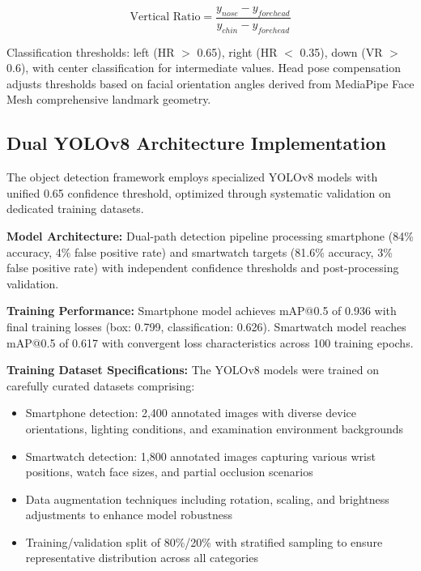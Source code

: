 \documentclass[conference]{IEEEtran}
\begin{document}
\begin{equation}
\text{Vertical Ratio} = \frac{y_{nose} - y_{forehead}}{y_{chin} - y_{forehead}}
\end{equation}

Classification thresholds: left (HR $>$ 0.65), right (HR $<$ 0.35), down (VR $>$ 0.6), 
with center classification for intermediate values. Head pose compensation adjusts 
thresholds based on facial orientation angles derived from MediaPipe Face Mesh 
comprehensive landmark geometry.

\subsection{Dual YOLOv8 Architecture Implementation}

The object detection framework employs specialized YOLOv8 models with unified 0.65 
confidence threshold, optimized through systematic validation on dedicated training 
datasets.

\textbf{Model Architecture:} Dual-path detection pipeline processing smartphone (84\% 
accuracy, 4\% false positive rate) and smartwatch targets (81.6\% accuracy, 3\% false 
positive rate) with independent confidence thresholds and post-processing validation.

\textbf{Training Performance:} Smartphone model achieves mAP@0.5 of 0.936 with final 
training losses (box: 0.799, classification: 0.626). Smartwatch model reaches mAP@0.5 
of 0.617 with convergent loss characteristics across 100 training epochs.

\textbf{Training Dataset Specifications:} The YOLOv8 models were trained on carefully 
curated datasets comprising:
\begin{itemize}
    \item Smartphone detection: 2,400 annotated images with diverse device orientations, 
    lighting conditions, and examination environment backgrounds
    \item Smartwatch detection: 1,800 annotated images capturing various wrist positions, 
    watch face sizes, and partial occlusion scenarios
    \item Data augmentation techniques including rotation, scaling, and brightness 
    adjustments to enhance model robustness
    \item Training/validation split of 80\%/20\% with stratified sampling to ensure 
    representative distribution across all categories
\end{itemize}
\end{document}

